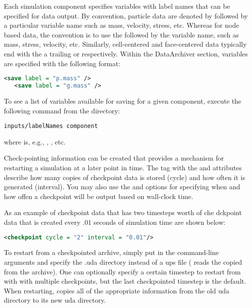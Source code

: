 Each simulation component specifies variables with label names that
can be specified for data output.  By convention, particle data are
denoted by  followed by a particular variable name
such as mass, velocity, stress, etc.  Whereas for node based data, the
convention is to use the  followed by the variable
name, such as mass, stress, velocity, etc.  Similarly, cell-centered
and face-centered data typically end with the a trailing 
or   respectively.  Within the DataArchiver
section, variables are specified with the following format:

\begin{lstlisting}[language=XML]
   <save label = "p.mass" />
   <save label = "g.mass" />
\end{lstlisting}

To see a list of
variables available for saving for a given component, execute the following
command from the  directory:

\begin{lstlisting}[backgroundcolor=\color{background}]
inputs/labelNames component
\end{lstlisting}
where  is, e.g., , , etc.

Check-pointing information can be created that provides a mechanism for
restarting a simulation at a later point in time.  The 
tag with the  and  attributes describe how many
copies of checkpoint data is stored (cycle) and how often it is generated
(interval).  You may also use the  and 
options for specifying when and how offen a checkpoint will be output based
on wall-clock time.

As an example of checkpoint data that has two timesteps worth of
che dckpoint data that is created every .01 seconds of simulation time
are shown below:

\begin{lstlisting}[language=XML]
<checkpoint cycle = "2" interval = "0.01"/>
\end{lstlisting}

To restart from a checkpointed archive, simply put  in the
 command-line arguments and specify the .uda directory instead of
a ups file ( reads the copied  from the
archive).  One can optionally specify a certain timestep to restart
from with  with multiple checkpoints, but the
last checkpointed timestep is the default.  When restarting, 
copies all of the appropriate information from the old uda directory to its
new uda directory.


